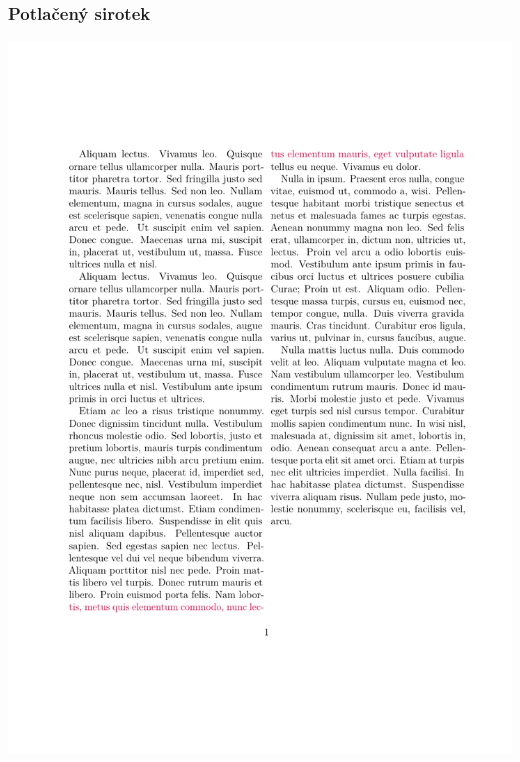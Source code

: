 \begin{frame}
  \frametitle{Potlačený sirotek}
  \begin{center}
    \includegraphics[height=\textheight,page=2]{examples/widow.pdf}
  \end{center}
\end{frame}

